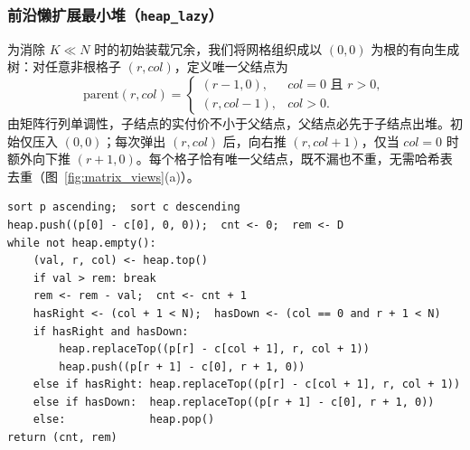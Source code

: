 \documentclass[12pt,a4paper,fontset=windows]{ctexart}
\theoremstyle{plain}
\newcommand{\code}[1]{\texttt{#1}}
\begin{document}
\subsubsection{前沿懒扩展最小堆（\texorpdfstring{\code{heap\_lazy}}{heap\_lazy}）}

为消除 $K \ll N$ 时的初始装载冗余，我们将网格组织成以 $(0,0)$ 为根的有向生成树：对任意非根格子 $(r, col)$，定义唯一父结点为
\[
\text{parent}(r, col) =
\begin{cases}
(r - 1, 0), & col = 0 \text{ 且 } r > 0,\\
(r, col - 1), & col > 0.
\end{cases}
\]
由矩阵行列单调性，子结点的实付价不小于父结点，父结点必先于子结点出堆。初始仅压入 $(0,0)$；每次弹出 $(r, col)$ 后，向右推 $(r, col+1)$，仅当 $col=0$ 时额外向下推 $(r+1, 0)$。每个格子恰有唯一父结点，既不漏也不重，无需哈希表去重（图~\ref{fig:matrix_views}(a)）。

\begin{lstlisting}[float=htbp, title={算法 2：前沿懒扩展最小堆（\code{heap\_lazy}）}]
sort p ascending;  sort c descending
heap.push((p[0] - c[0], 0, 0));  cnt <- 0;  rem <- D
while not heap.empty():
    (val, r, col) <- heap.top()
    if val > rem: break
    rem <- rem - val;  cnt <- cnt + 1
    hasRight <- (col + 1 < N);  hasDown <- (col == 0 and r + 1 < N)
    if hasRight and hasDown:
        heap.replaceTop((p[r] - c[col + 1], r, col + 1))
        heap.push((p[r + 1] - c[0], r + 1, 0))
    else if hasRight: heap.replaceTop((p[r] - c[col + 1], r, col + 1))
    else if hasDown:  heap.replaceTop((p[r + 1] - c[0], r + 1, 0))
    else:             heap.pop()
return (cnt, rem)
\end{lstlisting}
\end{document}
